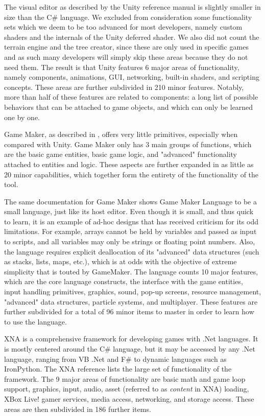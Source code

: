 The visual editor as described by the Unity reference manual \cite{CHAPTER_8_UNITY_REFERENCE_MANUAL} is slightly smaller in size than the C\# language. We excluded from consideration some functionality sets which we deem to be too advanced for most developers, namely custom shaders and the internals of the Unity deferred shader. We also did not count the terrain engine and the tree creator, since these are only used in specific games and as such many developers will simply skip these areas because they do not need them. The result is that Unity features 6 major areas of functionality, namely components, animations, GUI, networking, built-in shaders, and scripting concepts. These areas are further subdivided in 210 minor features. Notably, more than half of these features are related to components: a long list of possible behaviors that can be attached to game objects, and which can only be learned one by one.

Game Maker, as described in \cite{CHAPTER_8_GAME_MAKER_MANUAL}, offers very little primitives, especially when compared with Unity. Game Maker only has 3 main groups of functions, which are the basic game entities, basic game logic, and "advanced" functionality attached to entities and logic. These aspects are further expanded in as little as 20 minor capabilities, which together form the entirety of the functionality of the tool.

The same documentation for Game Maker shows Game Maker Language to be a small language, just like its host editor. Even though it is small, and thus quick to learn, it is an example of ad-hoc designs that has received criticism for its odd limitations. For example, arrays cannot be held by variables and passed as input to scripts, and all variables may only be strings or floating point numbers. Also, the language requires explicit deallocation of its "advanced" data structures (such as stacks, lists, maps, etc.), which is at odds with the objective of extreme simplicity that is touted by GameMaker. The language counts 10 major features, which are the core language constructs, the interface with the game entities, input handling primitives, graphics, sound, pop-up screens, resource management, "advanced" data structures, particle systems, and multiplayer. These features are further subdivided for a total of 96 minor items to master in order to learn how to use the language.

XNA is a comprehensive framework for developing games with .Net languages. It is mostly centered around the C\# language, but it may be accessed by any .Net language, ranging from VB .Net and F\# to dynamic languages such as IronPython. The XNA reference \cite{CHAPTER_8_XNA_REFERENCE} lists the large set of functionality of the framework. The 9 major areas of functionality are basic math and game loop support, graphics, input, audio, asset (referred to as \textit{content} in XNA) loading, XBox Live! gamer services, media access, networking, and storage access. These areas are then subdivided in 186 further items.

